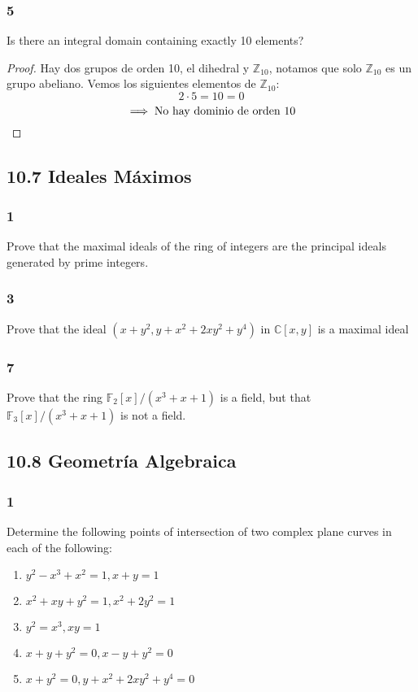 \documentclass[11pt]{article}
\newcommand{\set}[1]{\mathbb{#1}}
\theoremstyle{definition}
\begin{document}
        \subsubsection{5}
        Is there an integral domain containing exactly 10 elements?
        \begin{proof}
            Hay dos grupos de orden 10, el dihedral y $\set{Z}_{10}$, notamos que solo $\set{Z}_{10}$ es un grupo abeliano. Vemos los siguientes elementos de $\set{Z}_{10}$:
            \[2\cdot 5=10=0\]
            \[\implies \textrm{No hay dominio de orden 10}\qedhere\]
        \end{proof}

        \subsection{10.7 Ideales Máximos}
        \subsubsection{1}
        Prove that the maximal ideals of the ring of integers are the principal ideals generated by prime integers.

        \subsubsection{3}
        Prove that the ideal $(x+y^2,y+x^2+2xy^2+y^4)$ in $\set{C}[x,y]$ is a maximal ideal

        \subsubsection{7}
        Prove that the ring $\set{F}_2[x]/(x^3+x+1)$ is a field, but that $\set{F}_3[x]/(x^3+x+1)$ is not a field.

        \subsection{10.8 Geometría Algebraica}
        \subsubsection{1}
        Determine the following points of intersection of two complex plane curves in each of the following:
        \begin{enumerate}[label=\textbf{(\alph*)}]
            \item $y^2-x^3+x^2=1, x+y=1$

            \item $x^2+xy+y^2=1, x^2+2y^2=1$

            \item $y^2=x^3,xy=1$

            \item $x+y+y^2=0,x-y+y^2=0$

            \item $x+y^2=0,y+x^2+2xy^2+y^4=0$
        \end{enumerate}
\end{document}
